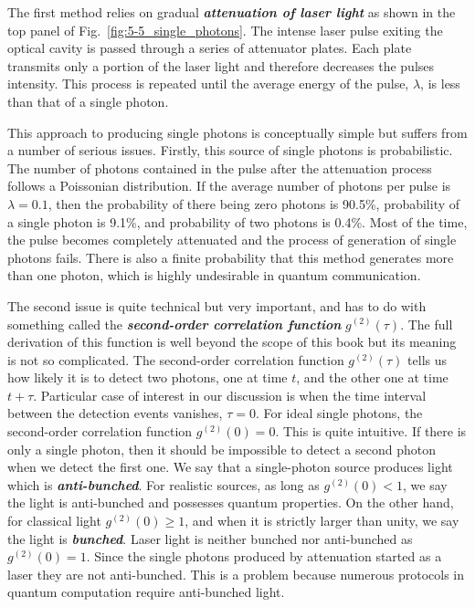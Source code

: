 The first method relies on gradual \textbf{\emph{attenuation of laser light}} as shown in the top panel of Fig.~\ref{fig:5-5_single_photons}.
The intense laser pulse exiting the optical cavity is passed through a series of attenuator plates.
Each plate transmits only a portion of the laser light and therefore decreases the pulses intensity.
This process is repeated until the average energy of the pulse, $\lambda$, is less than that of a single photon.

This approach to producing single photons is conceptually simple but suffers from a number of serious issues.
Firstly, this source of single photons is probabilistic.
The number of photons contained in the pulse after the attenuation process follows a Poissonian distribution.
If the average number of photons per pulse is $\lambda = 0.1$, then the probability of there being zero photons is 90.5\%, probability of a single photon is 9.1\%, and probability of two photons is 0.4\%.
Most of the time, the pulse becomes completely attenuated and the process of generation of single photons fails.
There is also a finite probability that this method generates more than one photon, which is highly undesirable in quantum communication.

The second issue is quite technical but very important, and has to do with something called the \textbf{\emph{second-order correlation function}} $g^{(2)}(\tau)$.
The full derivation of this function is well beyond the scope of this book but its meaning is not so complicated.
The second-order correlation function $g^{(2)}(\tau)$ tells us how likely it is to detect two photons, one at time $t$, and the other one at time $t+\tau$.
Particular case of interest in our discussion is when the time interval between the detection events vanishes, $\tau = 0$.
For ideal single photons, the second-order correlation function $g^{(2)}(0) = 0$.
This is quite intuitive.
If there is only a single photon, then it should be impossible to detect a second photon when we detect the first one.
We say that a single-photon source produces light which is \textbf{\emph{anti-bunched}}.
For realistic sources, as long as $g^{(2)}(0) < 1$, we say the light is anti-bunched and possesses quantum properties.
On the other hand, for classical light $g^{(2)}(0) \geq 1$, and when it is strictly larger than unity, we say the light is \textbf{\emph{bunched}}.
Laser light is neither bunched nor anti-bunched as $g^{(2)}(0)=1$.
Since the single photons produced by attenuation started as a laser they are not anti-bunched.
This is a problem because numerous protocols in quantum computation require anti-bunched light.

